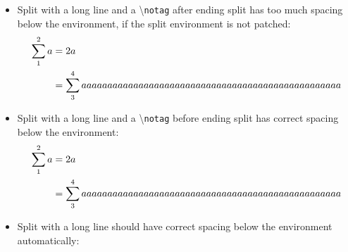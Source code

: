 \documentclass{article}
\begin{document}
\begin{itemize}
		\item Split with a long line and a \textbackslash\texttt{notag} after ending split has too much spacing below the environment, if the split environment is not patched:
			\begin{equation}
				\begin{split}
					\sum_1^2 a &= 2a\\
							&= \sum_3^4 aaaaaaaaaaaaaaaaaaaaaaaaaaaaaaaaaaaaaaaaaaaaaaaaaa
				\end{split}\notag
			\end{equation}
		\item Split with a long line and a \textbackslash\texttt{notag} before ending split has correct spacing below the environment:
			\begin{equation}
				\begin{split}
					\sum_1^2 a &= 2a\\
							&= \sum_3^4 aaaaaaaaaaaaaaaaaaaaaaaaaaaaaaaaaaaaaaaaaaaaaaaaaa\notag
				\end{split}
			\end{equation}
		\item Split with a long line should have correct spacing below the environment automatically:
			\begin{equation}
				\begin{split}

\end{split}
\end{equation}
\end{itemize}
\end{document}
